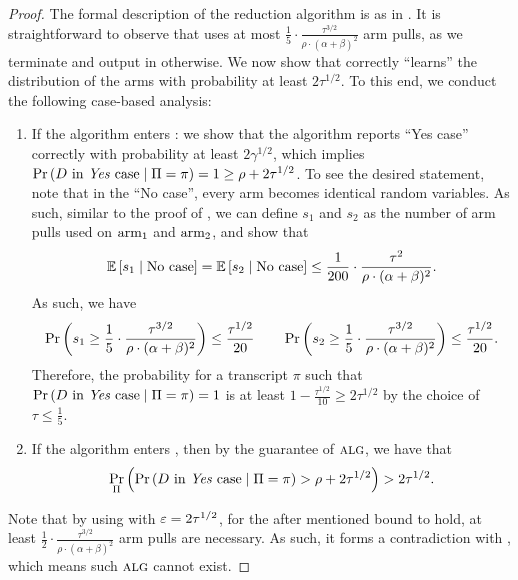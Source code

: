 \begin{proof}
	The formal description of the reduction algorithm is as in . It is straightforward to observe that  uses at most $\frac{1}{5}\cdot \frac{\tau^{3/2}}{\rho \cdot(\alpha+\beta)^2}$ arm pulls, as we terminate and output in  otherwise. We now show that  correctly ``learns'' the distribution of the arms with probability at least $2\tau^{1/2}$. To this end, we conduct the following case-based analysis:
	\begin{enumerate}[label=\roman*).]
		\item If the algorithm enters : we show that the algorithm reports ``Yes case'' correctly with probability at least $2\gamma^{1/2}$, which implies $\operatorname*{\textnormal{Pr}}\left(\text{$D$ in \emph{Yes} case} \mid \Pi=\pi\right)=1\geq \rho + 2 \tau^{1/2}$. To see the desired statement, note that in the ``No case'', every arm becomes identical random variables. As such, similar to the proof of , we can define $s_1$ and $s_2$ as the number of arm pulls used on $\textnormal{arm}_1$ and $\textnormal{arm}_2$, and show that
		\begin{align*}
			\operatorname*{{\mathbb{E}}}\left[s_1 \mid \text{No case}\right] =\operatorname*{{\mathbb{E}}}\left[s_2 \mid \text{No case}\right] \leq \frac{1}{200}\cdot \frac{\tau^2}{\rho\cdot (\alpha+\beta)^2}.
		\end{align*}
		As such, we have
		\begin{align*}
			\operatorname*{\textnormal{Pr}}\left(s_1\geq \frac{1}{5}\cdot \frac{\tau^{3/2}}{\rho\cdot (\alpha+\beta)^2}\right) \leq \frac{\tau^{1/2}}{20}  \qquad \operatorname*{\textnormal{Pr}}\left(s_2\geq \frac{1}{5}\cdot \frac{\tau^{3/2}}{\rho\cdot (\alpha+\beta)^2}\right) \leq \frac{\tau^{1/2}}{20}.
		\end{align*}
		Therefore, the probability for a transcript $\pi$ such that $\operatorname*{\textnormal{Pr}}\left(\text{$D$ in \emph{Yes} case} \mid \Pi=\pi\right)=1$ is at least $1-\frac{\tau^{1/2}}{10}\geq 2\tau^{1/2}$ by the choice of $\tau\leq \frac{1}{5}$. 
		\item If the algorithm enters , then by the guarantee of $\mbox{\sc alg}$, we have that
		\begin{align*}
			\operatorname*{\textnormal{Pr}}_{\Pi}\left(\operatorname*{\textnormal{Pr}}\left(\text{$D$ in \emph{Yes} case} \mid \Pi=\pi\right)>\rho+2\tau^{1/2}\right) > 2\tau^{1/2}.
		\end{align*}
	\end{enumerate}
	Note that by using  with $\varepsilon=2\tau^{1/2}$, for the after mentioned bound to hold, at least $\frac{1}{2}\cdot \frac{\tau^{3/2}}{\rho\cdot (\alpha+\beta)^2}$ arm pulls are necessary. As such, it forms a contradiction with , which means such $\mbox{\sc alg}$ cannot exist.
	
	\FloatBarrier
\end{proof}


